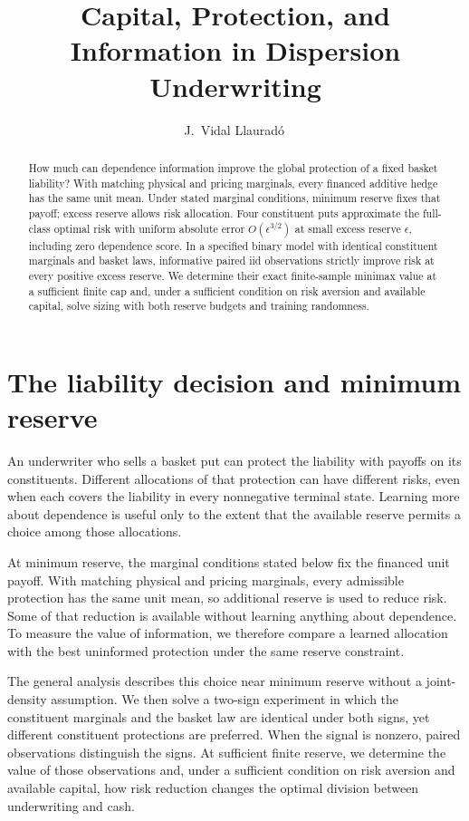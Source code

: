 \documentclass[11pt,a4paper]{amsart}
\title[Capital, protection, and information]{Capital, Protection, and Information in Dispersion Underwriting}
\author[J.~Vidal Llaurad\'o]{J.~Vidal Llaurad\'o\,\orcidlink{0009-0002-1918-5458}}
\date{}
\theoremstyle{plain}
\theoremstyle{definition}
\theoremstyle{remark}
\begin{document}
\begin{abstract}
How much can dependence information improve the global protection of a fixed basket liability? With matching physical and pricing marginals, every financed additive hedge has the same unit mean. Under stated marginal conditions, minimum reserve fixes that payoff; excess reserve allows risk allocation. Four constituent puts approximate the full-class optimal risk with uniform absolute error $O(\epsilon^{3/2})$ at small excess reserve $\epsilon$, including zero dependence score. In a specified binary model with identical constituent marginals and basket laws, informative paired iid observations strictly improve risk at every positive excess reserve. We determine their exact finite-sample minimax value at a sufficient finite cap and, under a sufficient condition on risk aversion and available capital, solve sizing with both reserve budgets and training randomness.
\end{abstract}
\maketitle

\section{The liability decision and minimum reserve}\label{sec:contract}

An underwriter who sells a basket put can protect the liability with payoffs on its constituents. Different allocations of that protection can have different risks, even when each covers the liability in every nonnegative terminal state. Learning more about dependence is useful only to the extent that the available reserve permits a choice among those allocations.

At minimum reserve, the marginal conditions stated below fix the financed unit payoff. With matching physical and pricing marginals, every admissible protection has the same unit mean, so additional reserve is used to reduce risk. Some of that reduction is available without learning anything about dependence. To measure the value of information, we therefore compare a learned allocation with the best uninformed protection under the same reserve constraint.

The general analysis describes this choice near minimum reserve without a joint-density assumption. We then solve a two-sign experiment in which the constituent marginals and the basket law are identical under both signs, yet different constituent protections are preferred. When the signal is nonzero, paired observations distinguish the signs. At sufficient finite reserve, we determine the value of those observations and, under a sufficient condition on risk aversion and available capital, how risk reduction changes the optimal division between underwriting and cash.
\end{document}

